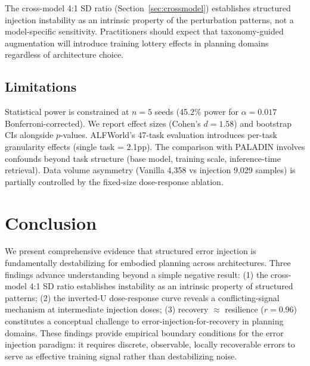 \documentclass[11pt,a4paper]{article}
\begin{document}
The cross-model 4:1 SD ratio (Section~\ref{sec:crossmodel}) establishes structured injection instability as an intrinsic property of the perturbation patterns, not a model-specific sensitivity. Practitioners should expect that taxonomy-guided augmentation will introduce training lottery effects in planning domains regardless of architecture choice.

\subsection{Limitations}

Statistical power is constrained at $n=5$ seeds (45.2\% power for $\alpha=0.017$ Bonferroni-corrected). We report effect sizes (Cohen's $d=1.58$) and bootstrap CIs alongside $p$-values. ALFWorld's 47-task evaluation introduces per-task granularity effects (single task = 2.1pp). The comparison with PALADIN involves confounds beyond task structure (base model, training scale, inference-time retrieval). Data volume asymmetry (Vanilla 4,358 vs injection 9,029 samples) is partially controlled by the fixed-size dose-response ablation.

\section{Conclusion}

We present comprehensive evidence that structured error injection is fundamentally destabilizing for embodied planning across architectures. Three findings advance understanding beyond a simple negative result: (1) the cross-model 4:1 SD ratio establishes instability as an intrinsic property of structured patterns; (2) the inverted-U dose-response curve reveals a conflicting-signal mechanism at intermediate injection doses; (3) recovery $\approx$ resilience ($r=0.96$) constitutes a conceptual challenge to error-injection-for-recovery in planning domains. These findings provide empirical boundary conditions for the error injection paradigm: it requires discrete, observable, locally recoverable errors to serve as effective training signal rather than destabilizing noise.
\end{document}

